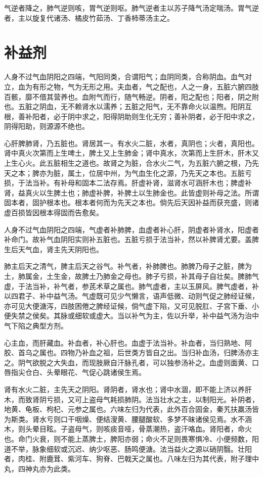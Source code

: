 \documentclass[UTF8]{ctexart}
\begin{document}
气逆者降之，肺气逆则咳，胃气逆则呕。肺气逆者主以苏子降气汤定喘汤。胃气逆者，主以旋复代诸汤、橘皮竹茹汤、丁香柿蒂汤主之。

\section{补益剂}
人身不过气血阴阳之四端，气阳同类，合谓阳气；血阴同类，合称阴血。血气对立，血为有形之物，气为无形之用。夫血者，气之配也，人之一身，五脏六腑四肢百骸，靡不借其营养也。血附气而行，随气畅逆。阴者，阳之配也；阳者，阴之附也。五脏之阴血，无不赖肾水以濡养；五脏之阳气，无不靠命火以温煦。阳阴互根，善补阳者，必于阴中求之，阳得阴助则生化无穷；善补阴者，必于阳中求之，阴得阳助，则源源不绝也。

心肝脾肺肾，乃五脏也。肾居其一。有水火二脏，水者，真阴也；火者，真阳也。肾中真火次第而上生啤土，脾土又上生肺金；肾中真水，次第而上生肝木，肝木又上生心火。此五脏相生之道也。故肾之为脏，合水火二气，为五脏六腑之根，乃先天之本；脾亦为脏，属土，位居中州，为气血生化之源，乃先天之本也。五脏亏损，于法当补。有补母和固本二法存焉。肝虚补肾，滋肾水可涵肝木也；脾虚补肾，益真火以生脾土也；肺虚补脾，补脾土以生肺金也。此皆虚则补母之法。所谓固本者，固护根本也。根本者何而为先天之本也。倘先后天因补益而获充盛，则诸虚百损皆因根本得固而告愈矣。

人身不过气血阴阳之四端，气虚者补肺脾，血虚者补心肝，阴虚者补肾水，阳虚者补命门。故补气血阴阳实则补五脏也。五脏亏损于法当补，然以补脾肾尤要。盖脾生后天气血，肾主先天阴阳也。

肺主后天之清气，脾主后天之谷气。补气者，补肺脾也。肺脾乃母子之脏，脾为土，肺属金，土生金，故脾土乃肺金之母也。肺子亏损，补其母子自壮矣。脾肺气虚，于法当补，补气者，参芪术草之属也。肺气虚者，主以玉屏风。脾气虚者，补以四君子、补中益气汤。气虚既可见少气懒言，语声低微、动则气促之肺经证候，亦可见大便溏泻，四肢困倦之脾经证候，倘气虚下陷，又可见脱肛、子宫下垂、小便失禁之侯矣。其脉或细软或虚大。当以补气为主，佐以升举，补中益气汤为治中气下陷之典型方剂。

心主血，而肝藏血。补血者，补心肝也。血虚于法当补。补血者，当归熟地、阿胶、首乌之属也。四物乃补血之祖，后世类方皆自之出。当归补血汤，归脾汤亦主之。阴气欲脱之大失血，而现肢厥自汗脉孔者，可以独参汤补之。血虚则面黄、口唇指尖仓白、头晕眼花、气促心跳诸侯生焉。

肾有水火二脏，主先天之阴阳。肾阴者，肾水也；肾中水涸，即不能上济以养肝木，而致肾阴亏损，又可上盗母气耗损肺阴。法当壮水之主，以制阳光。补阴者，地黄、龟板、枸杞、元参之属也。六味左归为代表，此外百合固金，秦艽扶羸汤皆为斯类。肾水亏则口干咽燥、便结溲黄、腰腿酸软、多梦不昧诸侯见焉。水不涵木，则头晕目眩。子盗母气，则咳痰音哑，骨蒸潮热，盗汗咯血。肾阳者，命火也。命门火衰，则不能上蒸脾土，脾阳亦弱；命火不足则畏寒惧冷、小便频数，阳道不举，脉象细软或沉迟、纳少呕恶、肠鸣便溏。法当益火之源以硝阴翳。壮阳者，肉桂、附鹿茸、紫河车、狗脊、巴戟天之属也。八味左归为其代表，附子理中丸，四神丸亦为此类。
\end{document}
